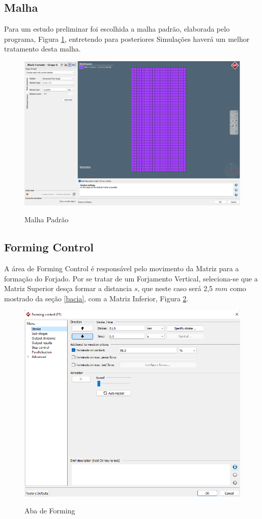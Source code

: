 \documentclass[deposito, acronym, symbols]{fei}
\begin{document}
\subsection{Malha} \label{malha}

Para um estudo preliminar foi escolhida a malha padrão, elaborada pelo programa, Figura \ref{fig:malha}, entretendo para posteriores Simulações haverá um melhor tratamento desta malha.

\begin{figure}[!htp]
    \centering
    \caption{Malha Padrão}
    \includegraphics[width=0.7\linewidth]{Imagens/Simufact - Malha Inicial.png}
    \label{fig:malha}
\end{figure}


\subsection{Forming Control}

A área de Forming Control é responsável pelo movimento da Matriz para a formação do Forjado. Por se tratar de um Forjamento Vertical, seleciona-se que a Matriz Superior desça formar a distancia $s$, que neste caso será 2,5 $mm$ como mostrado da seção \ref{bacia}, com a Matriz Inferior, Figura \ref{fig:Forming}.

\begin{figure}[!htp]
    \centering
    \caption{Aba de Forming}
    \includegraphics[width=0.7\linewidth]{Imagens/Simufact - Forming.png}
    \label{fig:Forming}
\end{figure}
\end{document}
